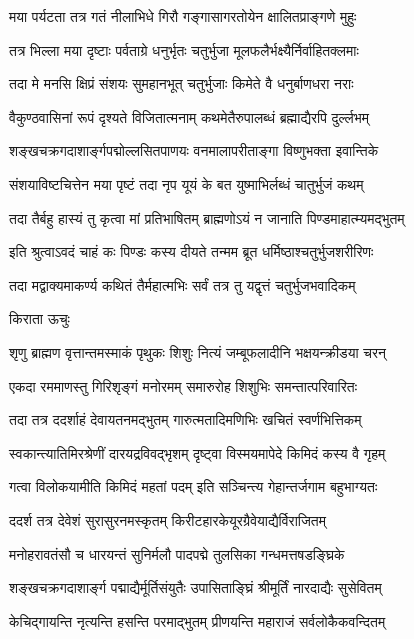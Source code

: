 \twolineshloka
{मया पर्यटता तत्र गतं नीलाभिधे गिरौ}
{गङ्गासागरतोयेन क्षालितप्राङ्गणे मुहुः}%

\twolineshloka
{तत्र भिल्ला मया दृष्टाः पर्वताग्रे धनुर्भृतः}
{चतुर्भुजा मूलफलैर्भक्ष्यैर्निर्वाहितक्लमाः}%

\twolineshloka
{तदा मे मनसि क्षिप्रं संशयः सुमहानभूत्}
{चतुर्भुजाः किमेते वै धनुर्बाणधरा नराः}%

\twolineshloka
{वैकुण्ठवासिनां रूपं दृश्यते विजितात्मनाम्}
{कथमेतैरुपालब्धं ब्रह्माद्यैरपि दुर्ल्लभम्}%

\twolineshloka
{शङ्खचक्रगदाशार्ङ्गपद्मोल्लसितपाणयः}
{वनमालापरीताङ्गा विष्णुभक्ता इवान्तिके}%

\twolineshloka
{संशयाविष्टचित्तेन मया पृष्टं तदा नृप}
{यूयं के बत युष्माभिर्लब्धं चातुर्भुजं कथम्}%

\twolineshloka
{तदा तैर्बहु हास्यं तु कृत्वा मां प्रतिभाषितम्}
{ब्राह्मणोऽयं न जानाति पिण्डमाहात्म्यमद्भुतम्}%

\twolineshloka
{इति श्रुत्वाऽवदं चाहं कः पिण्डः कस्य दीयते}
{तन्मम ब्रूत धर्मिष्ठाश्चतुर्भुजशरीरिणः}%

\twolineshloka
{तदा मद्वाक्यमाकर्ण्य कथितं तैर्महात्मभिः}
{सर्वं तत्र तु यद्वृत्तं चतुर्भुजभवादिकम्}%

किराता ऊचुः

\twolineshloka
{शृणु ब्राह्मण वृत्तान्तमस्माकं पृथुकः शिशुः}
{नित्यं जम्बूफलादीनि भक्षयन्क्रीडया चरन्}%

\twolineshloka
{एकदा रममाणस्तु गिरिशृङ्गं मनोरमम्}
{समारुरोह शिशुभिः समन्तात्परिवारितः}%

\twolineshloka
{तदा तत्र ददर्शाहं देवायतनमद्भुतम्}
{गारुत्मतादिमणिभिः खचितं स्वर्णभित्तिकम्}%

\twolineshloka
{स्वकान्त्यातिमिरश्रेणीं दारयद्रविवद्भृशम्}
{दृष्ट्वा विस्मयमापेदे किमिदं कस्य वै गृहम्}%

\twolineshloka
{गत्वा विलोकयामीति किमिदं महतां पदम्}
{इति सञ्चिन्त्य गेहान्तर्जगाम बहुभाग्यतः}%

\twolineshloka
{ददर्श तत्र देवेशं सुरासुरनमस्कृतम्}
{किरीटहारकेयूरग्रैवेयाद्यैर्विराजितम्}%

\twolineshloka
{मनोहरावतंसौ च धारयन्तं सुनिर्मलौ}
{पादपद्मे तुलसिका गन्धमत्तषडङ्घ्रिके}%

\twolineshloka
{शङ्खचक्रगदाशार्ङ्ग पद्माद्यैर्मूर्तिसंयुतैः}
{उपासिताङ्घ्रिं श्रीमूर्तिं नारदाद्यैः सुसेवितम्}%

\twolineshloka
{केचिद्गायन्ति नृत्यन्ति हसन्ति परमाद्भुतम्}
{प्रीणयन्ति महाराजं सर्वलोकैकवन्दितम्}%

